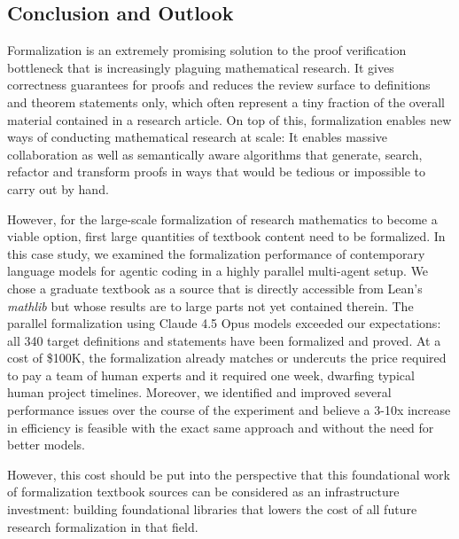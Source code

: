 \documentclass[]{fairmeta}
\begin{document}
\subsection{Conclusion and Outlook}

Formalization is an extremely promising solution to the proof verification bottleneck that is increasingly plaguing mathematical research.
It gives correctness guarantees for proofs and reduces the review surface to definitions and theorem statements only, which often represent a tiny fraction of the overall material contained in a research article.
On top of this, formalization enables new ways of conducting mathematical research at scale:
It enables massive collaboration \citep{bolan2025equational} as well as
semantically aware algorithms that generate, search, refactor and transform proofs in ways that would be tedious or impossible to carry out by hand.

However, for the large-scale formalization of research mathematics to become a viable option, first large quantities of textbook content need to be formalized.
In this case study, we examined the formalization performance of contemporary language models for agentic coding in a highly parallel multi-agent setup.
We chose a graduate textbook as a source that is directly accessible from Lean's \emph{mathlib} but whose results are to large parts not yet contained therein.
The parallel formalization using Claude 4.5 Opus models exceeded our expectations: all 340 target definitions and statements have been formalized and proved.
At a cost of \$100K, the formalization 
already matches or undercuts the price required to pay a team of human experts and it required one week, dwarfing typical human project timelines.
Moreover, we identified and improved several performance issues over the course of the experiment and believe a 3-10x increase in efficiency is feasible with the exact same approach and without the need for better models.

However, this cost should be put into the perspective that this foundational work of formalization textbook sources can be considered as an infrastructure investment: building foundational libraries that lowers the cost of all future research formalization in that field.
\end{document}
